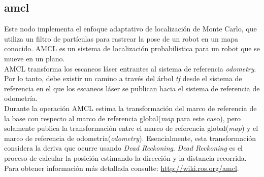 \documentclass[user_manual.tex]{subfiles}
\begin{document}
\subsection{amcl}

Este nodo implementa el enfoque adaptativo de localización de Monte Carlo, que utiliza un filtro de partículas para rastrear la pose de un robot en un mapa conocido. AMCL es un sistema de localización probabilística para un robot que se mueve en un plano.\\

AMCL transforma los escaneos láser entrantes al sistema de referencia \textit{odometry}. Por lo tanto, debe existir un camino a través del árbol \textit{tf} desde el sistema de referencia en el que los escaneos láser se publican hacia el sistema de referencia de odometría.\\

Durante la operación AMCL estima la transformación del marco de referencia de la base con respecto al marco de referencia global(\textit{map} para este caso), pero solamente publica la transformación entre el marco de referencia global(\textit{map}) y el marco de referencia de odometría(\textit{odometry}). Esencialmente, esta transformación considera la deriva que ocurre usando \textit{Dead Reckoning}. \textit{Dead Reckoning} es el proceso de calcular la posición estimando la dirección y la distancia recorrida.\\

Para obtener información más detallada consulte: \url{http://wiki.ros.org/amcl}.
\end{document}
